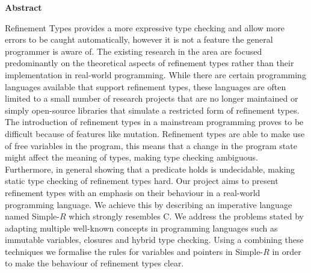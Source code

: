 \newpage
{\Huge \bf Abstract}
\vspace{24pt} 

Refinement Types provides a more expressive type checking and allow more errors to be caught automatically, however it is not a feature the general programmer is aware of. The existing research in the area are focused predominantly on the theoretical aspects of refinement types rather than their implementation in real-world programming. While there are certain programming languages available that support refinement types, these languages are often limited to a small number of research projects that are no longer maintained or simply open-source libraries that simulate a restricted form of refinement types. The introduction of refinement types in a mainstream programming proves to be difficult because of features like mutation. Refinement types are able to make use of free variables in the program, this means that a change in the program state might affect the meaning of types, making type checking ambiguous. Furthermore, in general showing that a predicate holds is undecidable, making static type checking of refinement types hard. Our project aims to present refinement types with an emphasis on their behaviour in a real-world programming language. We achieve this by describing an imperative language named Simple-$R$ which strongly resembles C. We address the problems stated by adapting multiple well-known concepts in programming languages such as immutable variables, closures and hybrid type checking. Using a combining these techniques we formalise the rules for variables and pointers in Simple-$R$ in order to make the behaviour of refinement types clear. 

\newpage
\vspace*{\fill}
